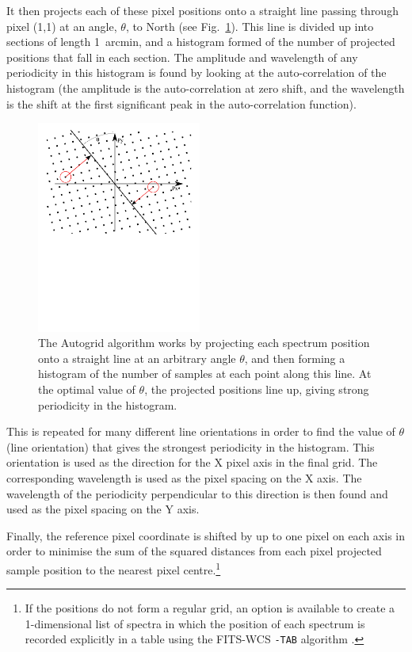 \documentclass[final,authoryear,5p,times,twocolumn]{elsarticle}
\begin{document}
It then projects each of these pixel positions onto a straight line
passing through pixel (1,1) at an angle, $\theta$, to North (see
Fig.~\ref{fig:autogrid}). This line is divided up into sections of
length 1~arcmin, and a histogram formed of the number of projected
positions that fall in each section. The amplitude and wavelength of
any periodicity in this histogram is found by looking at the
auto-correlation of the histogram (the amplitude is the
auto-correlation at zero shift, and the wavelength is the shift at the
first significant peak in the auto-correlation function).

\begin{figure}
\includegraphics[width=0.48\textwidth]{autogrid}
\caption{The Autogrid algorithm works by projecting each spectrum
  position onto a straight line at an arbitrary angle $\theta$, and then
  forming a histogram of the number of samples at each point along
  this line. At the optimal value of $\theta$, the projected positions
  line up, giving strong periodicity in the histogram.}
\label{fig:autogrid}
\end{figure}

This is repeated for many different line orientations in order to find
the value of $\theta$ (line orientation) that gives the strongest
periodicity in the histogram. This orientation is used as the
direction for the X pixel axis in the final grid. The corresponding
wavelength is used as the pixel spacing on the X axis. The wavelength
of the periodicity perpendicular to this direction is then found and
used as the pixel spacing on the Y axis.

Finally, the reference pixel coordinate is shifted by up to one pixel
on each axis in order to minimise the sum of the squared distances
from each pixel projected sample position to the nearest pixel
centre.\footnote{If the positions do not form a regular grid, an option is
available to create a 1-dimensional list of spectra in which the
position of each spectrum is recorded explicitly in a table using
the FITS-WCS \texttt{-TAB} algorithm \citep{2006A&A...446..747G}.}
\end{document}
